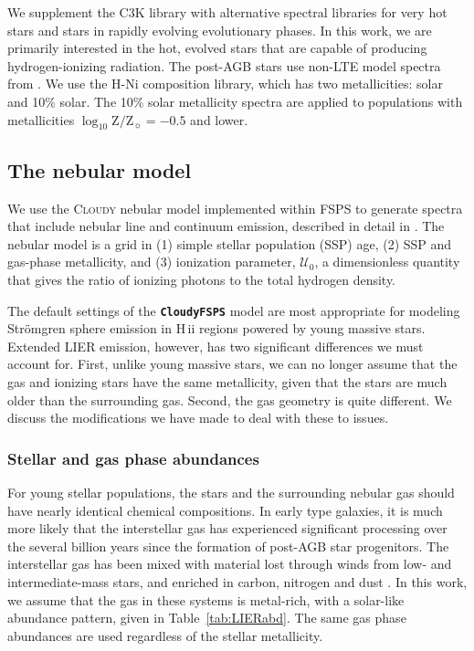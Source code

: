 \documentclass[preprint2]{aastex62}
\newcommand{\FSPS}{{\sc FSPS}\xspace}
\newcommand{\CloudyFSPS}{{\tt \textbf{CloudyFSPS}}\xspace}
\newcommand{\Cloudy}{\textsc{Cloudy}\xspace}
\newcommand{\hii}{H\,{\sc ii}\xspace}
\newcommand{\logten}{\ensuremath{\log_{10}}}
\newcommand{\logZeq}[1]{\ensuremath{\logten \mathrm{Z}/\mathrm{Z}_{\sun} = #1}}
\newcommand{\U}{\ensuremath{\mathcal{U}_{0}}\xspace}
\begin{document}
We supplement the C3K library with alternative spectral libraries for very hot stars and stars in rapidly evolving evolutionary phases. In this work, we are primarily interested in the hot, evolved stars that are capable of producing hydrogen-ionizing radiation. The post-AGB stars use non-LTE model spectra from \citet{Rauch+2003}. We use the H-Ni composition library, which has two metallicities: solar and 10\% solar. The 10\% solar metallicity spectra are applied to populations with metallicities \logZeq{-0.5} and lower. 

\subsection{The nebular model}\label{sec:model:neb}

We use the \Cloudy nebular model implemented within \FSPS to generate spectra that include nebular line and continuum emission, described in detail in \citet{Byler+2017}. The nebular model is a grid in (1) simple stellar population (SSP) age, (2) SSP and gas-phase metallicity, and (3) ionization parameter, \U, a dimensionless quantity that gives the ratio of ionizing photons to the total hydrogen density.

The default settings of the \CloudyFSPS model are most appropriate for modeling Str{\"o}mgren sphere emission in \hii regions powered by young massive stars. Extended LIER emission, however, has two significant differences we must account for. First, unlike young massive stars, we can no longer assume that the gas and ionizing stars have the same metallicity, given that the stars are much older than the surrounding gas. Second, the gas geometry is quite different. We discuss the modifications we have made to deal with these to issues.

\subsubsection{Stellar and gas phase abundances}\label{sec:LIERmod:abunds}

For young stellar populations, the stars and the surrounding nebular gas should have nearly identical chemical compositions. In early type galaxies, it is much more likely that the interstellar gas has experienced significant processing over the several billion years since the formation of post-AGB star progenitors. The interstellar gas has been mixed with material lost through winds from low- and intermediate-mass stars, and enriched in carbon, nitrogen and dust \citep[e.g.,][]{Griffith+2019}. In this work, we assume that the gas in these systems is metal-rich, with a solar-like abundance pattern, given in Table~\ref{tab:LIERabd}. The same gas phase abundances are used regardless of the stellar metallicity.
\end{document}
